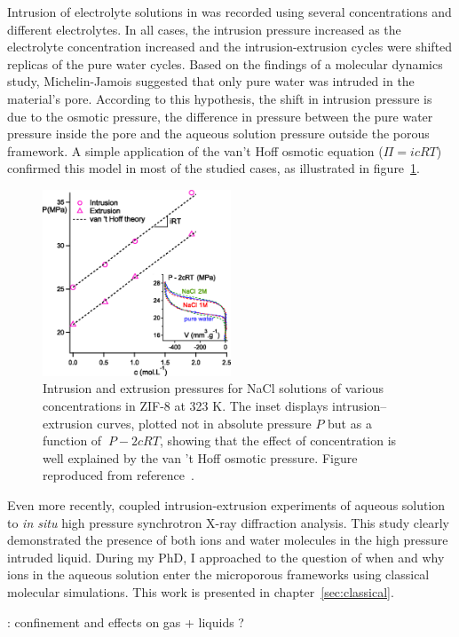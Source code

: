 \documentclass[thesis]{subfiles}
\begin{document}
Intrusion of electrolyte solutions in  was recorded using several
concentrations and different electrolytes\cite{Ortiz2014, MichelinJamois2015}.
In all cases, the intrusion pressure increased as the electrolyte concentration
increased and the intrusion-extrusion cycles were shifted replicas of the pure
water cycles. Based on the findings of a molecular dynamics study\cite{Hu2011},
Michelin-Jamois suggested that only pure water was intruded in the material's
pore. According to this hypothesis, the shift in intrusion pressure is due to
the osmotic pressure, \ie the difference in pressure between the pure water
pressure inside the pore and the aqueous solution pressure outside the porous
framework. A simple application of the van't Hoff osmotic equation ($\Pi = i c R
T$) confirmed this model in most of the studied cases, as illustrated in
figure~\ref{fig:osmotic-zif}.

\begin{figure}[ht]
    \centering
    \includegraphics[width=0.5\textwidth]{figures/cited/osmotic-zif}
    \caption{Intrusion and extrusion pressures for NaCl solutions of
    various concentrations in ZIF-8 at 323 K. The inset displays
    intrusion--extrusion curves, plotted not in absolute pressure $P$ but as a
    function of $\ P - 2cRT$, showing that the effect of concentration is well
    explained by the van 't Hoff osmotic pressure. Figure reproduced from
    reference~\cite{MichelinJamois2015}.}
    \label{fig:osmotic-zif}
\end{figure}

Even more recently, \citeauthor{Arletti2016}\cite{Arletti2016} coupled
intrusion-extrusion experiments of  aqueous solution to \emph{in situ}
high pressure synchrotron X-ray diffraction analysis. This study clearly
demonstrated the presence of both ions and water molecules in the high pressure
intruded liquid. During my PhD, I approached to the question of when and why
ions in the aqueous solution enter the microporous frameworks using classical
molecular simulations. This work is presented in chapter~\ref{sec:classical}.

\TODO: confinement and effects on gas + liquids ?

\OnlyInSubfile{\printbibliography}
\end{document}
